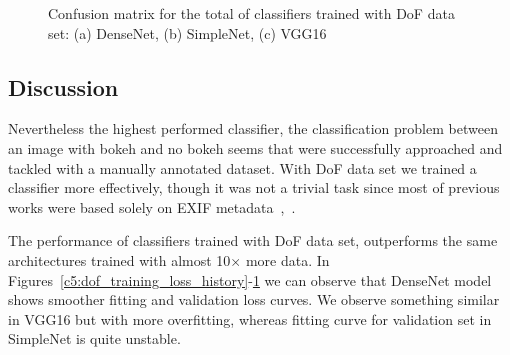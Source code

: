 \begin{figure}[ht!]
    \centering  
    \caption{Confusion matrix for the total of classifiers trained with DoF data set: (a) DenseNet, (b) SimpleNet, (c) VGG16}
    \label{c5:dof_cm}
\end{figure}

\subsection{Discussion}

Nevertheless the highest performed classifier, the classification problem between an image with bokeh and no bokeh seems that were successfully approached and tackled with a manually annotated dataset. With DoF data set we trained a classifier more effectively, though it was not a trivial task since most of previous works were based solely on EXIF metadata~\cite{guptaexif},~\cite{laurence2018camera}.

The performance of classifiers trained with DoF data set, outperforms the same architectures trained with almost 10$\times$ more data. In Figures~\ref{c5:dof_training_loss_history}-\ref{c5:dof_cm} we can observe that DenseNet model shows smoother fitting and validation loss curves. We observe something similar in VGG16 but with more overfitting, whereas fitting curve for validation set in SimpleNet is quite unstable.

